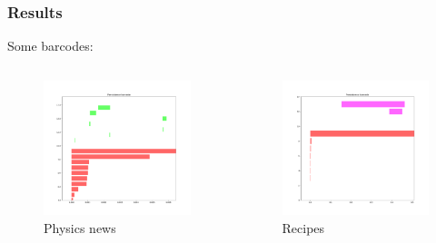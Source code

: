 \documentclass[unknownkeysallowed]{beamer}
\begin{document}
\begin{frame}
\frametitle{Results}
Some barcodes:
\begin{columns}[c]
\begin{figure}
\includegraphics[width=0.9\linewidth]{../plots/barcodes/phys-b-all}
\caption{Physics news}
\end{figure}

\begin{figure}
\includegraphics[width=0.9\linewidth]{../plots/barcodes/recipes-b-all}
\caption{Recipes}
\end{figure}

\end{columns}
\end{frame}
\end{document}
